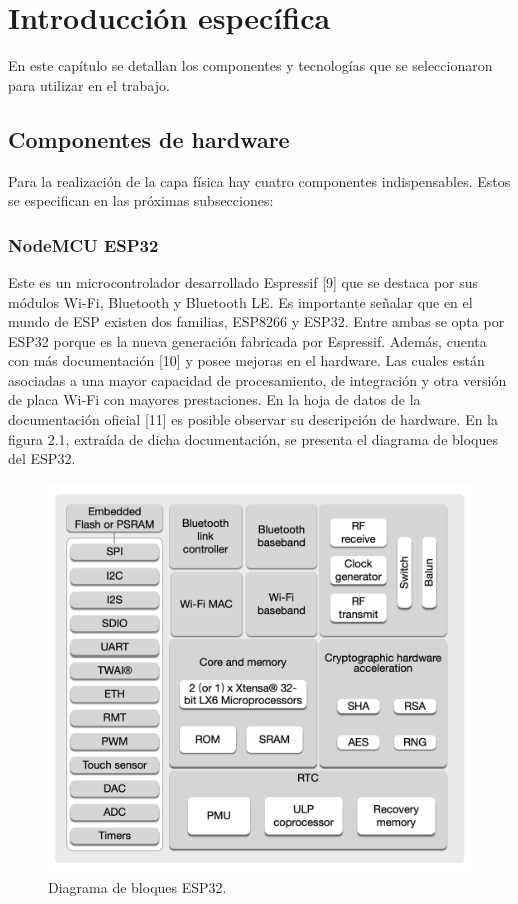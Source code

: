 \chapter{Introducción específica} %

En este capítulo se detallan los componentes y tecnologías que se seleccionaron para utilizar en el trabajo.

\section{Componentes de hardware}
Para la realización de la capa física hay cuatro componentes indispensables. Estos se especifican en las próximas subsecciones:

\subsection{NodeMCU ESP32}
Este es un microcontrolador desarrollado Espressif [9] que se destaca por sus módulos Wi-Fi, Bluetooth y Bluetooth LE. Es importante señalar que en el mundo de ESP existen dos familias, ESP8266 y ESP32. Entre ambas se opta por ESP32 porque es la nueva generación fabricada por Espressif. Además, cuenta con más documentación [10] y posee mejoras en el hardware. Las cuales están asociadas a una mayor capacidad de procesamiento, de integración y otra versión de placa Wi-Fi con mayores prestaciones. En la hoja de datos de la documentación oficial [11] es posible observar su descripción de hardware. En la figura 2.1, extraída de dicha documentación, se presenta el diagrama de bloques del ESP32.\\

\begin{figure}[htpb]
\centering 
\includegraphics[width=.6\textwidth]{./Figures/esp32hardware.png}
\caption{Diagrama de bloques ESP32.}
\label{fig:diagBloques}
\end{figure}

